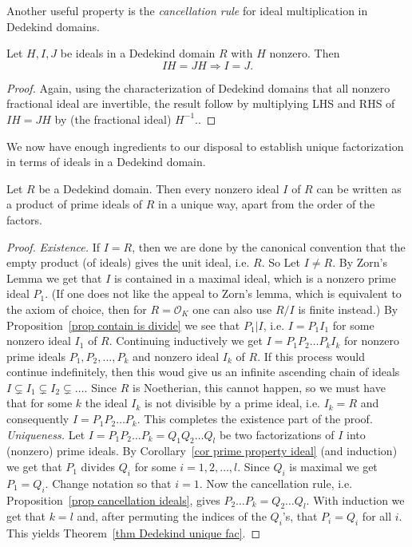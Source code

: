 \documentclass{amsart}
\begin{document}
Another useful property is the \emph{cancellation rule} for ideal multiplication in Dedekind domains.

\begin{proposition}\label{prop cancellation ideals}
Let $H,I,J$ be ideals in a Dedekind domain $R$ with $H$ nonzero. Then
\[ IH=JH \Rightarrow I=J.\]
\end{proposition}

\begin{proof}
Again, using the characterization of Dedekind domains that all nonzero fractional ideal are invertible, the result follow by multiplying LHS and RHS of $IH=JH$ by (the fractional ideal) $H^{-1}$.. 
\end{proof}


We now have enough ingredients to our disposal to establish unique factorization in terms of ideals in a Dedekind domain.
\begin{theorem}\label{thm Dedekind unique fac}
Let $R$ be a Dedekind domain. Then every nonzero ideal $I$ of $R$ can be written as a product of prime ideals of $R$ in a unique way, apart from the order of the factors.
\end{theorem}

\begin{proof}
\emph{Existence.} If $I=R$, then we are done by the canonical convention that the empty product (of ideals) gives the unit ideal, i.e. $R$. So Let $I \not=R$. By Zorn's Lemma we get that $I$ is contained in a maximal ideal, which is a nonzero prime ideal $P_1$.
(If one does not like the appeal to Zorn's lemma, which is equivalent to the axiom of choice, then for $R=\mathcal{O}_K$ one can also use $R/I$ is finite instead.)
By Proposition~\ref{prop contain is divide} we see that $P_1|I$, i.e. $I=P_1 I_1$ for some nonzero ideal $I_1$ of $R$. Continuing inductively we get $I=P_1P_2\ldots P_k I_k$ for nonzero prime ideals $P_1,P_2,\ldots, P_k$ and nonzero ideal $I_k$ of $R$. If this process would continue indefinitely, then this woud give us an infinite ascending chain of ideals $I\subsetneq I_1 \subsetneq I_2 \subsetneq \ldots$. Since $R$ is Noetherian, this cannot happen, so we must have that for some $k$ the ideal $I_k$ is not divisible by a prime ideal, i.e. $I_k=R$ and consequently $I=P_1P_2\ldots P_k$. This completes the existence part of the proof.\\
\emph{Uniqueness.} Let $I=P_1P_2\ldots P_k=Q_1Q_2\ldots Q_l$ be two factorizations of $I$ into (nonzero) prime ideals. By Corollary~\ref{cor prime property ideal} (and induction) we get that $P_1$ divides $Q_i$ for some $i=1,2,\ldots,l$. Since $Q_i$ is maximal we get $P_1=Q_i$. Change notation so that $i=1$. Now the cancellation rule, i.e. Proposition~\ref{prop cancellation ideals}, gives $P_2 \ldots P_k=Q_2 \ldots Q_l$. With induction we get that $k=l$ and, after permuting the indices of the $Q_i$'s, that $P_i=Q_i$ for all $i$. This yields Theorem~\ref{thm Dedekind unique fac}.
\end{proof}
\end{document}
